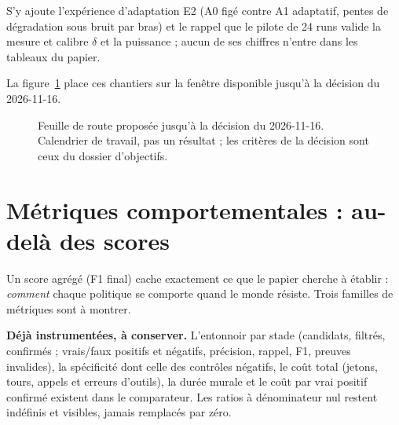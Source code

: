 \documentclass[11pt,a4paper]{article}
\begin{document}
S'y ajoute l'exp\'erience d'adaptation E2 (A0 fig\'e contre A1 adaptatif, pentes de d\'egradation sous bruit par bras) et le rappel que le pilote de 24 runs valide la mesure et calibre $\delta$ et la puissance ; aucun de ses chiffres n'entre dans les tableaux du papier.

La figure~\ref{fig:route} place ces chantiers sur la fen\^etre disponible jusqu'\`a la d\'ecision du 2026-11-16.

\begin{figure}[htbp]
\centering
{}
\caption{Feuille de route propos\'ee jusqu'\`a la d\'ecision du 2026-11-16. Calendrier de travail, pas un r\'esultat ; les crit\`eres de la d\'ecision sont ceux du dossier d'objectifs.}
\label{fig:route}
\end{figure}

\section{M\'etriques comportementales : au-del\`a des scores}
\label{sec:metriques}

Un score agr\'eg\'e (F1 final) cache exactement ce que le papier cherche \`a \'etablir : \emph{comment} chaque politique se comporte quand le monde r\'esiste. Trois familles de m\'etriques sont \`a montrer.

\textbf{D\'ej\`a instrument\'ees, \`a conserver.} L'entonnoir par stade (candidats, filtr\'es, confirm\'es ; vrais/faux positifs et n\'egatifs, pr\'ecision, rappel, F1, preuves invalides), la sp\'ecificit\'e dont celle des contr\^oles n\'egatifs, le co\^ut total (jetons, tours, appels et erreurs d'outils), la dur\'ee murale et le co\^ut par vrai positif confirm\'e existent dans le comparateur. Les ratios \`a d\'enominateur nul restent ind\'efinis et visibles, jamais remplac\'es par z\'ero.
\end{document}

